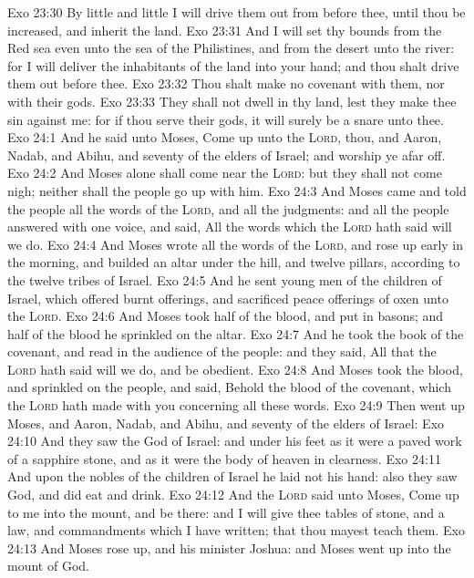 \vs Exo 23:30 By little and little I will drive them out from before thee, until thou be increased, and inherit the land.
\vs Exo 23:31 And I will set thy bounds from the Red sea even unto the sea of the Philistines, and from the desert unto the river: for I will deliver the inhabitants of the land into your hand; and thou shalt drive them out before thee.
\vs Exo 23:32 Thou shalt make no covenant with them, nor with their gods.
\vs Exo 23:33 They shall not dwell in thy land, lest they make thee sin against me: for if thou serve their gods, it will surely be a snare unto thee.
\vs Exo 24:1 And he said unto Moses, Come up unto the \textsc{Lord}, thou, and Aaron, Nadab, and Abihu, and seventy of the elders of Israel; and worship ye afar off.
\vs Exo 24:2 And Moses alone shall come near the \textsc{Lord}: but they shall not come nigh; neither shall the people go up with him.
\vs Exo 24:3 And Moses came and told the people all the words of the \textsc{Lord}, and all the judgments: and all the people answered with one voice, and said, All the words which the \textsc{Lord} hath said will we do.
\vs Exo 24:4 And Moses wrote all the words of the \textsc{Lord}, and rose up early in the morning, and builded an altar under the hill, and twelve pillars, according to the twelve tribes of Israel.
\vs Exo 24:5 And he sent young men of the children of Israel, which offered burnt offerings, and sacrificed peace offerings of oxen unto the \textsc{Lord}.
\vs Exo 24:6 And Moses took half of the blood, and put  in basons; and half of the blood he sprinkled on the altar.
\vs Exo 24:7 And he took the book of the covenant, and read in the audience of the people: and they said, All that the \textsc{Lord} hath said will we do, and be obedient.
\vs Exo 24:8 And Moses took the blood, and sprinkled  on the people, and said, Behold the blood of the covenant, which the \textsc{Lord} hath made with you concerning all these words.
\vs Exo 24:9 Then went up Moses, and Aaron, Nadab, and Abihu, and seventy of the elders of Israel:
\vs Exo 24:10 And they saw the God of Israel: and  under his feet as it were a paved work of a sapphire stone, and as it were the body of heaven in  clearness.
\vs Exo 24:11 And upon the nobles of the children of Israel he laid not his hand: also they saw God, and did eat and drink.
\vs Exo 24:12 And the \textsc{Lord} said unto Moses, Come up to me into the mount, and be there: and I will give thee tables of stone, and a law, and commandments which I have written; that thou mayest teach them.
\vs Exo 24:13 And Moses rose up, and his minister Joshua: and Moses went up into the mount of God.

